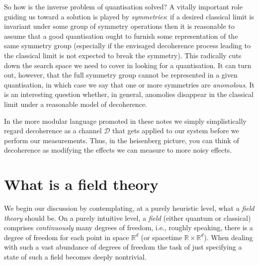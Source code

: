 \documentclass[11pt]{amsart}
\theoremstyle{plain}%
\theoremstyle{definition}
\theoremstyle{remark}
\begin{document}
So how is the inverse problem of quantisation solved? A vitally important role guiding us toward a solution is played by \emph{symmetries}: if a desired classical limit is invariant under some group of symmetry operations then it is reasonable to assume that a good quantisation ought to furnish some representation of the same symmetry group (especially if the envisaged decoherence process leading to the classical limit is not expected to break the symmetry). This radically cuts down the search space we need to cover in looking for a quantisation. It can turn out, however, that the full symmetry group cannot be represented in a given quantisation, in which case we say that one or more symmetries are \emph{anomolous}. It is an interesting question whether, in general, anomolies disappear in the classical limit under a reasonable model of decoherence.

In the more modular language promoted in these notes we simply simplistically regard decoherence as a channel $\mathcal{D}$ that gets applied to our system before we perform our measurements. Thus, in the heisenberg picture, you can think of decoherence as modifying the effects we can measure to more noisy effects.  

\section{What is a field theory}\label{sec:whatisqft}
We begin our discussion by contemplating, at a purely heuristic level, what a \emph{field theory} should be. On a purely intuitive level, a \emph{field} (either quantum or classical) comprises \emph{continuously} many degrees of freedom, i.e., roughly speaking, there is a degree of freedom for each point in space $\mathbb{R}^d$ (or spacetime $\mathbb{R}\times \mathbb{R}^d$). When dealing with such a vast abundance of degrees of freedom the task of just specifying a state of such a field becomes deeply nontrivial. 
\end{document}
